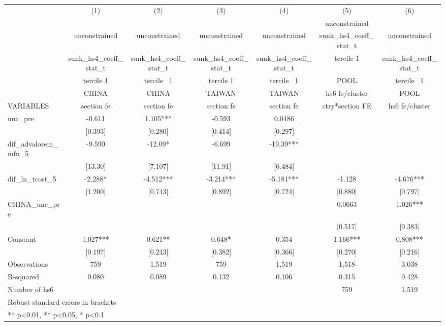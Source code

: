 \begin{adjustbox}{max width=\textwidth}
\begin{tabular}{lcccccc}
\toprule
 & (1) & (2) & (3) & (4) & (5) & (6) \\
 &  &  &  &  & unconstrained &  \\
 & unconstrained & unconstrained & unconstrained & unconstrained & sunk\_hs4\_coeff\_stat\_t & unconstrained \\
 & sunk\_hs4\_coeff\_stat\_t & sunk\_hs4\_coeff\_stat\_t & sunk\_hs4\_coeff\_stat\_t & sunk\_hs4\_coeff\_stat\_t & tercile 1 & sunk\_hs4\_coeff\_stat\_t \\
 & tercile 1 & tercile~ 1 & tercile 1 & tercile~ 1 & POOL & tercile~ 1 \\
 & CHINA & CHINA & TAIWAN & TAIWAN & hs6 fe/cluster & POOL \\
VARIABLES & section fe & section fe & section fe & section fe & ctry*section FE & hs6 fe/cluster \\
\midrule
unc\_pre & -0.611 & 1.105*** & -0.593 & 0.0486 &  &  \\
 & [0.393] & [0.280] & [0.414] & [0.297] &  &  \\
dif\_advalorem\_mfn\_5 & -9.590 & -12.09* & -6.699 & -19.39*** &  &  \\
 & [13.30] & [7.107] & [11.91] & [6.484] &  &  \\
dif\_ln\_tcost\_5 & -2.288* & -4.512*** & -3.214*** & -5.181*** & -1.128 & -4.676*** \\
 & [1.200] & [0.743] & [0.892] & [0.724] & [0.880] & [0.797] \\
CHINA\_unc\_pre &  &  &  &  & 0.0663 & 1.026*** \\
 &  &  &  &  & [0.517] & [0.383] \\
Constant & 1.027*** & 0.621** & 0.648* & 0.354 & 1.166*** & 0.808*** \\
 & [0.197] & [0.243] & [0.382] & [0.366] & [0.270] & [0.216] \\
\midrule
Observations & 759 & 1,519 & 759 & 1,519 & 1,518 & 3,038 \\
R-squared & 0.080 & 0.089 & 0.132 & 0.106 & 0.315 & 0.428 \\
Number of hs6 &  &  &  &  & 759 & 1,519 \\
\bottomrule
\multicolumn{7}{l}{\footnotesize Robust standard errors in brackets} \\
\multicolumn{7}{l}{\footnotesize *** p<0.01, ** p<0.05, * p<0.1} \\
\end{tabular}
\end{adjustbox}
